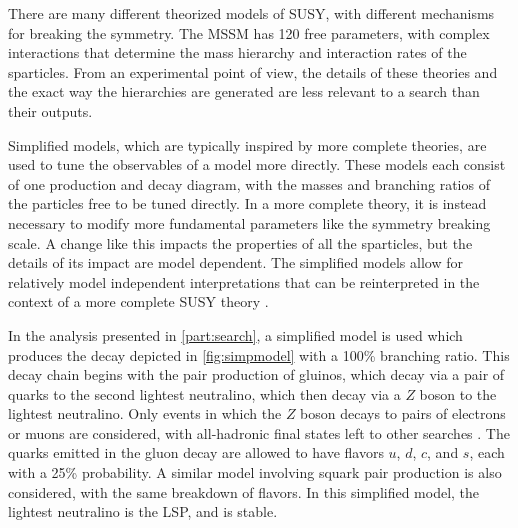 There are many different theorized models of \ac{SUSY}, with different mechanisms for breaking the symmetry. The \ac{MSSM} has 120 free parameters, with complex interactions that determine the mass hierarchy and interaction rates of the sparticles. From an experimental point of view, the details of these theories and the exact way the hierarchies are generated are less relevant to a search than their outputs. 

Simplified models, which are typically inspired by more complete theories, are used to tune the observables of a model more directly. These models each consist of one production and decay diagram, with the masses and branching ratios of the particles free to be tuned directly. In a more complete theory, it is instead necessary to modify more fundamental parameters like the symmetry breaking scale. A change like this impacts the properties of all the sparticles, but the details of its impact are model dependent. The simplified models allow for relatively model independent interpretations that can be reinterpreted in the context of a more complete \ac{SUSY} theory \cite{1608.00872}.

In the analysis presented in \autoref{part:search}, a simplified model is used which produces the decay depicted in \autoref{fig:simpmodel} with a 100\% branching ratio. This decay chain begins with the pair production of gluinos, which decay via a pair of quarks to the second lightest neutralino, which then decay via a $Z$ boson to the lightest neutralino. Only events in which the $Z$ boson decays to pairs of electrons or muons are considered, with all-hadronic final states left to other searches \cite{ATLAS:2016kts}. The quarks emitted in the gluon decay are allowed to have flavors $u$, $d$, $c$, and $s$, each with a 25\% probability. A similar model involving squark pair production is also considered, with the same breakdown of flavors. In this simplified model, the lightest neutralino is the \ac{LSP}, and is stable. 

